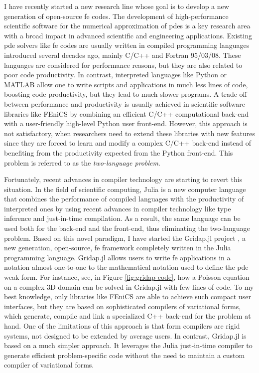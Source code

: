 \documentclass{article}
\begin{document}
I have recently started a new research line whose goal is to develop a new generation of open-source \ac{fe} codes.  The development of high-performance scientific software for the numerical approximation of \acp{pde} is a key research area with a broad impact in advanced scientific and engineering applications. Existing \ac{pde} solvers like \ac{fe} codes are usually written in compiled programming languages introduced several decades ago, mainly C/C++ and Fortran 95/03/08. These languages are considered for performance reasons, but they are also related to poor code productivity. In contrast, interpreted languages like Python or MATLAB allow one to write scripts and applications in much less lines of code, boosting code productivity, but they lead to much slower programs. A trade-off between performance and productivity is usually achieved in scientific software libraries like FEniCS by combining an efficient C/C++ computational back-end with a user-friendly high-level Python user front-end. However, this approach is not satisfactory, when researchers need to extend these libraries with new features since they are forced to learn and modify a complex C/C++ back-end instead of benefiting from the productivity expected from the Python front-end. This problem is referred to as the \emph{two-language problem}.

Fortunately, recent advances in compiler technology are starting to revert this situation. In the field of scientific computing, Julia is a new computer language that combines the performance of compiled languages with the productivity of interpreted ones by using recent advances in compiler technology like type inference and just-in-time compilation. As a result, the same language can be used both for the back-end and the front-end, thus eliminating the two-language problem. Based on this novel paradigm, I have started the Gridap.jl project \cite{Badia2020}, a new generation, open-source, \ac{fe} framework completely written in the Julia programming language. Gridap.jl allows users to write \ac{fe} applications in a notation almost one-to-one to the mathematical notation used to define the \ac{pde} weak form. For instance, see, in Figure \ref{fig:gridap-code}, how a Poisson equation on a complex 3D domain can be solved in Gridap.jl with few lines of code. To my best knowledge, only libraries like FEniCS are able to achieve such compact user interfaces, but they are based on sophisticated compilers of variational forms, which generate, compile and link a specialized C++ back-end for the problem at hand. One of the limitations of this approach is that form compilers are rigid systems, not designed to be extended by average users. In contrast, Gridap.jl is based on a much simpler approach. It leverages the Julia just-in-time compiler to generate efficient problem-specific code without the need to maintain a custom compiler of variational forms.
\end{document}
